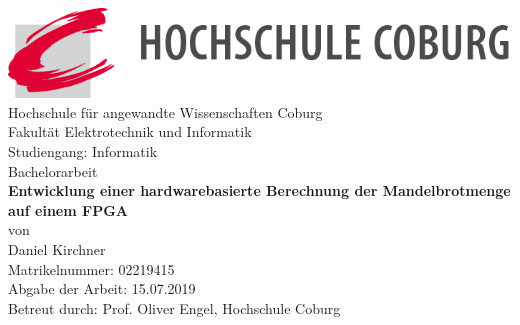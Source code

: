 \documentclass[a4paper,12pt,onesided]{report}
\begin{document}

\begin{titlepage}
	\centering
	\includegraphics[width=14.9cm]{img/logo}\\

	\fontsize{18}{20}\selectfont
	Hochschule für angewandte Wissenschaften Coburg\\[.1cm]
	Fakultät Elektrotechnik und Informatik\\[1.2cm]
	Studiengang: Informatik\\
	Bachelorarbeit\\[1.2cm]
	\fontsize{21}{23}\selectfont
	\textbf{Entwicklung einer hardwarebasierte Berechnung der 
	Mandelbrotmenge auf einem FPGA}\\[1cm]
	\fontsize{18}{20}\selectfont
	von\\[1.2cm]
	Daniel Kirchner\\
	Matrikelnummer: 02219415\\[1.2cm]
	Abgabe der Arbeit: 15.07.2019\\[1.2cm]

	Betreut durch: Prof. Oliver Engel, Hochschule Coburg
\end{titlepage}
\end{document}
